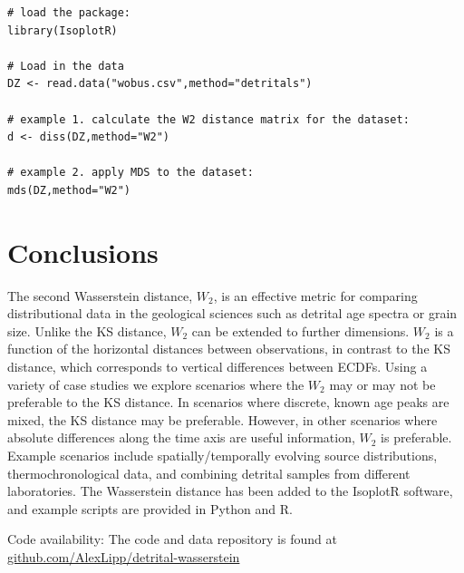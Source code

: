 \documentclass[gchron, manuscript]{article}
\begin{document}
\begin{verbatim}
# load the package:
library(IsoplotR)

# Load in the data 
DZ <- read.data("wobus.csv",method="detritals")

# example 1. calculate the W2 distance matrix for the dataset:
d <- diss(DZ,method="W2") 

# example 2. apply MDS to the dataset:
mds(DZ,method="W2")
\end{verbatim}

\section{Conclusions}
 
The second Wasserstein distance, $W_2$, is an effective metric for comparing distributional data in the geological sciences such as detrital age spectra or grain size. Unlike the KS distance, $W_2$ can be extended to further dimensions. $W_2$ is a function of the horizontal distances between observations, in contrast to the KS distance, which corresponds to vertical differences between ECDFs. 
Using a variety of case studies we explore scenarios where the $W_2$ may or may not be preferable to the KS distance. In scenarios where discrete, known age peaks are mixed, the KS distance may be preferable. However, in other scenarios where absolute differences along the time axis are useful information, $W_2$ is preferable. Example scenarios include spatially/temporally evolving source distributions, thermochronological data, and combining detrital samples from different laboratories. The Wasserstein distance has been added to the IsoplotR software, and example scripts are provided in Python and R. 



Code availability: {The code and data repository is found at \href{https://github.com/AlexLipp/detrital-wasserstein}{\url{github.com/AlexLipp/detrital-wasserstein}}} %
\end{document}
